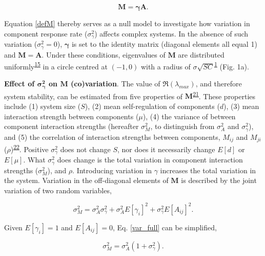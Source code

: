 \documentclass[]{article}
\begin{document}
\begin{equation} \label{defM}
\mathbf{M} = \boldsymbol{\gamma} \mathbf{A}.
\end{equation}

Equation \ref{defM} thereby serves as a null model to investigate how
variation in component response rate (\(\sigma^{2}_{\gamma}\)) affects
complex systems. In the absence of such variation
(\(\sigma^{2}_{\gamma} = 0\)), \(\boldsymbol{\gamma}\) is set to the
identity matrix (diagonal elements all equal 1) and
\(\mathbf{M} = \mathbf{A}\). Under these conditions, eigenvalues of
\(\mathbf{M}\) are distributed
uniformly\textsuperscript{\protect\hyperlink{ref-Tao2010}{15}} in a
circle centred at \((-1, 0)\) with a radius of
\(\sigma \sqrt{SC}\)\textsuperscript{\protect\hyperlink{ref-May1972}{1}}
(Fig. 1a).

\textbf{Effect of \(\mathbf{\sigma^{2}_{\gamma}}\) on \(\mathbf{M}\)
(co)variation}. The value of \(\Re(\lambda_{max})\), and therefore
system stability, can be estimated from five properties of
\(\mathbf{M}\)\textsuperscript{\protect\hyperlink{ref-Tang2014b}{21}}.
These properties include (1) system size (\(S\)), (2) mean
self-regulation of components (\(d\)), (3) mean interaction strength
between components (\(\mu\)), (4) the variance of between component
interaction strengths (hereafter \(\sigma^{2}_{M}\), to distinguish from
\(\sigma^{2}_{A}\) and \(\sigma^{2}_{\gamma}\)), and (5) the correlation
of interaction strengths between components, \(M_{ij}\) and \(M_{ji}\)
(\(\rho\))\textsuperscript{\protect\hyperlink{ref-Sommers1988}{22}}.
Positive \(\sigma^{2}_{\gamma}\) does not change \(S\), nor does it
necessarily change \(E[d]\) or \(E[\mu]\). What \(\sigma^{2}_{\gamma}\)
does change is the total variation in component interaction strengths
(\(\sigma^{2}_{M}\)), and \(\rho\). Introducing variation in \(\gamma\)
increases the total variation in the system. Variation in the
off-diagonal elements of \(\mathbf{M}\) is described by the joint
variation of two random variables,

\begin{equation} \label{var_full}
\sigma^{2}_{M} = \sigma^{2}_{A}\sigma^{2}_{\gamma} + \sigma^{2}_{A}E[\gamma_{i}]^{2}+\sigma^{2}_{\gamma}E[A_{ij}]^{2}.
\end{equation}

Given \(E[\gamma_{i}] = 1\) and \(E[A_{ij}] = 0\), Eq. \ref{var_full}
can be simplified,

\begin{equation} 
\sigma^{2}_{M} = \sigma^{2}_{A}(1 + \sigma^{2}_{\gamma}). \nonumber
\end{equation}
\end{document}
